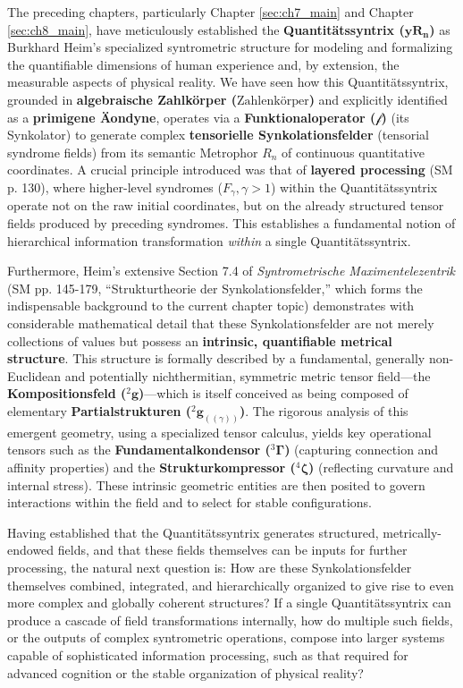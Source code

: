 \documentclass[
    12pt,              %
    a4paper,           %
    headings=normal,   %
    twoside=true,      %
    BCOR=8mm,          %
]{scrbook}
\newcommand{\q}[1]{\enquote{#1}}
\newcommand{\syndrom}{F}
\newcommand{\quantitaetssyntrix}{\bm{yR_n}}
\newcommand{\zahlenkoerper}{\text{Zahlenkörper}}
\newcommand{\semantischermetrophor}{R_n}
\newcommand{\funktionaloperator}{\mathcal{f}}
\newcommand{\kompositionsfeld}{{}^2\mathbf{g}}
\newcommand{\partialstruktur}[1]{{}^2\mathbf{g}_{(#1)}}
\newcommand{\fundamentalkondensor}{{}^3\bm{\Gamma}}
\newcommand{\strukturkompressor}{{}^4\bm{\zeta}}
\begin{document}
The preceding chapters, particularly Chapter \ref{sec:ch7_main} and Chapter \ref{sec:ch8_main}, have meticulously established the \textbf{Quantitätssyntrix (\(\quantitaetssyntrix\))} as Burkhard Heim's specialized syntrometric structure for modeling and formalizing the quantifiable dimensions of human experience and, by extension, the measurable aspects of physical reality. We have seen how this Quantitätssyntrix, grounded in \textbf{algebraische Zahlkörper (\(\zahlenkoerper\))} and explicitly identified as a \textbf{primigene Äondyne}, operates via a \textbf{Funktionaloperator (\(\funktionaloperator\))} (its Synkolator) to generate complex \textbf{tensorielle Synkolationsfelder} (tensorial syndrome fields) from its semantic Metrophor \(\semantischermetrophor\) of continuous quantitative coordinates. A crucial principle introduced was that of \textbf{layered processing} (SM p. 130), where higher-level syndromes (\(\syndrom_\gamma, \gamma > 1\)) within the Quantitätssyntrix operate not on the raw initial coordinates, but on the already structured tensor fields produced by preceding syndromes. This establishes a fundamental notion of hierarchical information transformation \textit{within} a single Quantitätssyntrix.

Furthermore, Heim’s extensive Section 7.4 of \textit{Syntrometrische Maximentelezentrik} (SM pp. 145-179, \q{Strukturtheorie der Synkolationsfelder,} which forms the indispensable background to the current chapter topic) demonstrates with considerable mathematical detail that these Synkolationsfelder are not merely collections of values but possess an \textbf{intrinsic, quantifiable metrical structure}. This structure is formally described by a fundamental, generally non-Euclidean and potentially nichthermitian, symmetric metric tensor field—the \textbf{Kompositionsfeld (\(\kompositionsfeld\))}—which is itself conceived as being composed of elementary \textbf{Partialstrukturen (\(\partialstruktur{(\gamma)}\))}. The rigorous analysis of this emergent geometry, using a specialized tensor calculus, yields key operational tensors such as the \textbf{Fundamentalkondensor (\(\fundamentalkondensor\))} (capturing connection and affinity properties) and the \textbf{Strukturkompressor (\(\strukturkompressor\))} (reflecting curvature and internal stress). These intrinsic geometric entities are then posited to govern interactions within the field and to select for stable configurations.

Having established that the Quantitätssyntrix generates structured, metrically-endowed fields, and that these fields themselves can be inputs for further processing, the natural next question is: How are these Synkolationsfelder themselves combined, integrated, and hierarchically organized to give rise to even more complex and globally coherent structures? If a single Quantitätssyntrix can produce a cascade of field transformations internally, how do multiple such fields, or the outputs of complex syntrometric operations, compose into larger systems capable of sophisticated information processing, such as that required for advanced cognition or the stable organization of physical reality?
\end{document}
